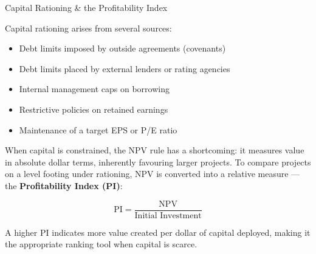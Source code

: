 \documentclass[10pt]{article}
\begin{document}
    \begin{core}{Capital Rationing \& the Profitability Index}

      Capital rationing arises from several sources:

      \begin{itemize}

        \item Debt limits imposed by outside agreements (covenants)

        \item Debt limits placed by external lenders or rating agencies

        \item Internal management caps on borrowing

        \item Restrictive policies on retained earnings

        \item Maintenance of a target EPS or P/E ratio

      \end{itemize}

      When capital is constrained, the NPV rule has a shortcoming: it measures value in absolute dollar terms, inherently favouring larger projects. To compare projects on a level footing under rationing, NPV is converted into a relative measure — the \textbf{Profitability Index (PI)}:

      \[
        \text{PI} = \frac{\text{NPV}}{\text{Initial Investment}}
      \]

      A higher PI indicates more value created per dollar of capital deployed, making it the appropriate ranking tool when capital is scarce.


    \end{core}
\end{document}
